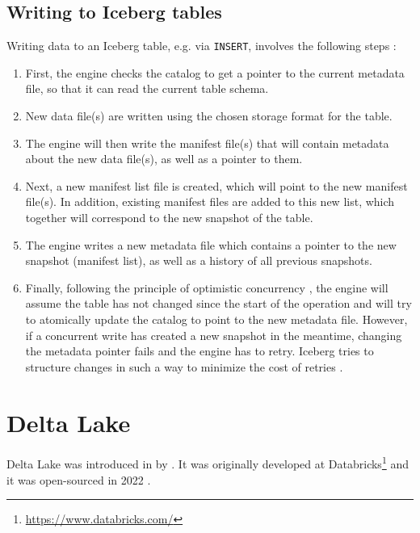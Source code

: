 \subsection{Writing to Iceberg tables}\label{sec:iceberg-writing}
Writing data to an Iceberg table, e.g. via \verb|INSERT|, involves the following steps \cite{jasonhughesApacheIcebergDefinitive2024}:
\begin{enumerate}
    \item First, the engine checks the catalog to get a pointer to the current metadata file, so that it can read the current table schema.

    \item New data file(s) are written using the chosen storage format for the table.

    \item The engine will then write the manifest file(s) that will contain metadata about the new data file(s), as well as a pointer to them.

    \item Next, a new manifest list file is created, which will point to the new manifest file(s). In addition, existing manifest files are added to this new list, which together will correspond to the new snapshot of the table.

    \item The engine writes a new metadata file which contains a pointer to the new snapshot (manifest list), as well as a history of all previous snapshots.

    \item Finally, following the principle of optimistic concurrency \cite{IcebergSpecOptimistic}, the engine will assume the table has not changed since the start of the operation and will try to atomically update the catalog to point to the new metadata file. However, if a concurrent write has created a new snapshot in the meantime, changing the metadata pointer fails and the engine has to retry. Iceberg tries to structure changes in such a way to minimize the cost of retries \cite{apacheicebergReliability}.
\end{enumerate}

\section{Delta Lake}\label{sec:lakehouse-delta}

Delta Lake was introduced in \citeyear{armbrust_delta_2020} by \citeauthor{armbrust_delta_2020} \cite{armbrust_delta_2020}. It was originally developed at Databricks\footnote{\url{https://www.databricks.com/}} and it was open-sourced in 2022 \cite{tathagatadasDelta20Foundation2022}.

